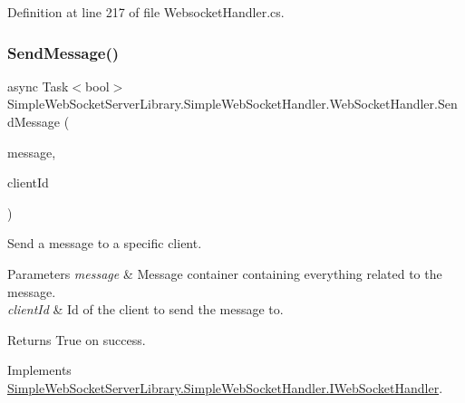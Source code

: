 Definition at line 217 of file Websocket\+Handler.\+cs.

\mbox{\label{class_simple_web_socket_server_library_1_1_simple_web_socket_handler_1_1_web_socket_handler_abee1c137ad80d04fb2a1de7644d2d60d}} 
\subsubsection{\texorpdfstring{Send\+Message()}{SendMessage()}\hspace{0.1cm}{\footnotesize\ttfamily [1/2]}}
{\footnotesize\ttfamily async Task$<$bool$>$ Simple\+Web\+Socket\+Server\+Library.\+Simple\+Web\+Socket\+Handler.\+Web\+Socket\+Handler.\+Send\+Message (\begin{DoxyParamCaption}\item[{\mbox{\hyperlink{class_simple_web_socket_server_library_1_1_web_socket_message_container}{Web\+Socket\+Message\+Container}}}]{message,  }\item[{string}]{client\+Id }\end{DoxyParamCaption})}



Send a message to a specific client. 


\begin{DoxyParams}{Parameters}
{\em message} & Message container containing everything related to the message.\\
\hline
{\em client\+Id} & Id of the client to send the message to.\\
\hline
\end{DoxyParams}
\begin{DoxyReturn}{Returns}
True on success.
\end{DoxyReturn}


Implements \mbox{\hyperlink{interface_simple_web_socket_server_library_1_1_simple_web_socket_handler_1_1_i_web_socket_handler_a3d9b246d14117c85014486b3f5bb71c8}{Simple\+Web\+Socket\+Server\+Library.\+Simple\+Web\+Socket\+Handler.\+I\+Web\+Socket\+Handler}}.



